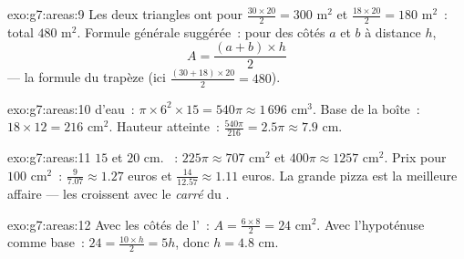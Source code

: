 \begin{solution}{exo:g7:areas:9}
Les deux triangles ont pour  $\frac{30 \times 20}{2} = 300$
m$^2$ et $\frac{18 \times 20}{2} = 180$ m$^2$~: total $480$ m$^2$.
Formule générale suggérée~: pour des côtés  $a$ et $b$ à
distance $h$,
\[
A = \frac{(a + b) \times h}{2}
\]
--- la formule du trapèze (ici $\frac{(30+18)\times 20}{2} = 480$).
\end{solution}

\begin{solution}{exo:g7:areas:10}
 d'eau~: $\pi \times 6^2 \times 15 = 540\pi \approx 1\,696$
cm$^3$. Base de la boîte~: $18 \times 12 = 216$ cm$^2$. Hauteur
atteinte~: $\frac{540\pi}{216} = 2.5\pi \approx 7.9$ cm.
\end{solution}

\begin{solution}{exo:g7:areas:11}
 $15$ et $20$ cm. ~: $225\pi \approx 707$ cm$^2$ et
$400\pi \approx 1257$ cm$^2$. Prix pour $100$ cm$^2$~:
$\frac{9}{7.07} \approx 1.27$ euros et
$\frac{14}{12.57} \approx 1.11$ euros. La grande pizza est la
meilleure affaire --- les  croissent avec le \emph{carré} du
.
\end{solution}

\begin{solution}{exo:g7:areas:12}
Avec les côtés de l'~: $A = \frac{6 \times 8}{2} = 24$
cm$^2$. Avec l'hypoténuse comme base~: $24 = \frac{10 \times h}{2} =
5h$, donc $h = 4.8$ cm.
\end{solution}

